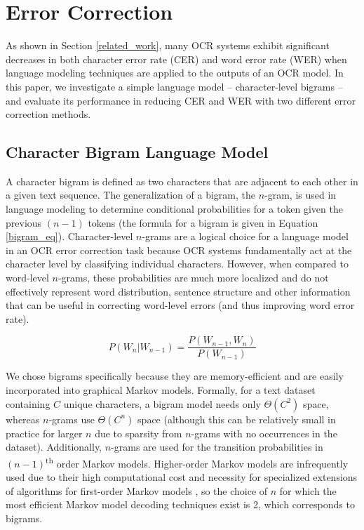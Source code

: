 \documentclass[10pt,twocolumn,letterpaper]{article}
\begin{document}
\section{Error Correction}
\label{error_correction}
As shown in Section \ref{related_work}, many OCR systems exhibit significant
decreases in both character error rate (CER) and word error rate (WER)
when language modeling techniques are applied to the outputs of an OCR
model. In this paper, we investigate a simple language model --
character-level bigrams -- and evaluate its performance in reducing CER
and WER with two different error correction methods.

\subsection{Character Bigram Language Model}

A character bigram is defined as two characters that are adjacent to
each other in a given text sequence. The generalization of a bigram,
the $n$-gram, is used in language modeling to determine conditional
probabilities for a token given the previous $(n - 1)$ tokens (the
formula for a bigram is given in Equation \ref{bigram_eq}).
Character-level $n$-grams are a logical choice for a language model
in an OCR error correction task because OCR systems fundamentally act
at the character level by classifying individual characters. However,
when compared to word-level $n$-grams, these probabilities are much
more localized and do not effectively represent word distribution,
sentence structure and other information that can be useful in correcting
word-level errors (and thus improving word error rate).

\begin{equation}
\label{bigram_eq}
P(W_n|W_{n-1}) = \frac{P(W_{n-1}, W_{n})}{P(W_{n-1})}
\end{equation}

We chose bigrams specifically because they are memory-efficient and
are easily incorporated into graphical Markov models. Formally, for
a text dataset containing $C$ unique characters, a bigram model
needs only $\Theta(C^2)$ space, whereas $n$-grams use
$\Theta(C^{n})$ space (although this can
be relatively small in practice for larger $n$ due to sparsity from
$n$-grams with no occurrences in the dataset). Additionally, $n$-grams
are used for the transition probabilities in
$(n-1)$\textsuperscript{th} order Markov models.
Higher-order Markov models are infrequently used due to their high
computational cost and necessity for specialized extensions of algorithms
for first-order Markov models \cite{DuPreez98-ETO}, so the choice of
$n$ for which the most efficient Markov model decoding techniques exist
is 2, which corresponds to bigrams.
\end{document}
